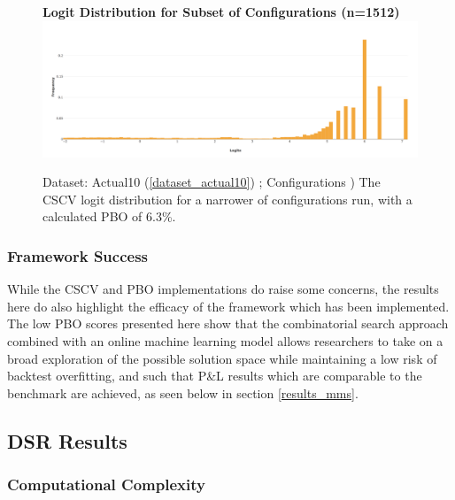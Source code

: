 \documentclass[a4paper,11pt,oneside]{article}
\theoremstyle{plain}
\theoremstyle{definition}
\begin{document}
	\begin{figure}[H]
		\centering 
		\textbf{Logit Distribution for Subset of Configurations (n=1512)}
		\includegraphics[scale=0.25]{images/results/pbo/subset_dist.png} 
		\caption[Logit Distribution for Subset of Configurations]{Dataset: Actual10 (\ref{dataset_actual10}) ; Configurations )
			\newline The CSCV logit distribution for a narrower of configurations run, with a calculated PBO of 6.3\%.}
		\label{figure-results_logits_subset}
	\end{figure}
	
	
	\subsubsection{Framework Success}
	
	
	While the CSCV and PBO implementations do raise some concerns, the results here do also highlight the efficacy of the framework which has been implemented. The low PBO scores presented here show that the combinatorial search approach combined with an online machine learning model allows researchers to take on a broad exploration of the possible solution space while maintaining a low risk of backtest overfitting, and such that P\&L results which are comparable to the benchmark are achieved, as seen below in section \ref{results_mms}.
	
	\newpage

	\subsection{DSR Results}\label{results_dsr}	
	
	\subsubsection{Computational Complexity}
	
\end{document}
